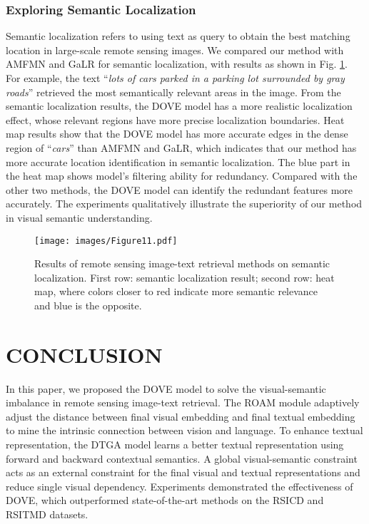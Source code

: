 \documentclass[journal]{IEEEtran}
\begin{document}
{\subsubsection{Exploring Semantic Localization}
Semantic localization \cite{yuan2022learning} refers to using text as query to obtain the best matching location in large-scale remote sensing images. We compared our method with AMFMN \cite{yuan2022exploring} and GaLR \cite{yuan2022remote} for semantic localization, with results as shown in Fig. \ref{fig:fig8}. For example, the text ``\emph{lots of cars parked in a parking lot surrounded by gray roads}'' retrieved the most semantically relevant areas in the image. From the semantic localization results, the DOVE model has a more realistic localization effect, whose relevant regions have more precise localization boundaries. Heat map results show that the DOVE model has more accurate edges in the dense region of ``\emph{cars}'' than AMFMN and GaLR, which indicates that our method has more accurate location identification in semantic localization. The blue part in the heat map shows model's filtering ability for redundancy. Compared with the other two methods, the DOVE model can identify the redundant features more accurately. The experiments qualitatively illustrate the superiority of our method in visual semantic understanding.
\begin{figure}[t]
  \centering
  \texttt{[image: images/Figure11.pdf]}
  \caption{Results of remote sensing image-text retrieval methods on semantic localization. First row: semantic localization result; second row: heat map, where colors closer to red indicate more semantic relevance and blue is the opposite.}
  \label{fig:fig8}
\end{figure}

\section{CONCLUSION}
In this paper, we proposed the DOVE model to solve the visual-semantic imbalance in remote sensing image-text retrieval. The ROAM module adaptively adjust the distance between final visual embedding and final textual embedding to mine the intrinsic connection between vision and language. To enhance textual representation, the DTGA model learns a better textual representation using forward and backward contextual semantics. A global visual-semantic constraint acts as an external constraint for the final visual and textual representations and reduce single visual dependency. Experiments demonstrated the effectiveness of DOVE, which outperformed state-of-the-art methods on the RSICD and RSITMD datasets.

}
\end{document}
